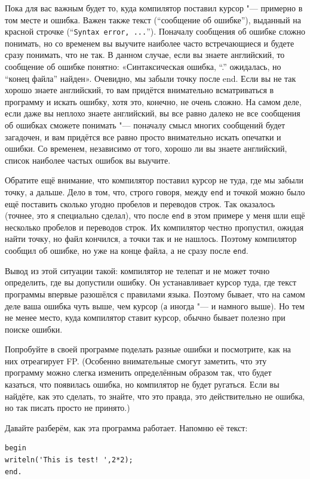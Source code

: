 Пока для вас важным будет то, куда компилятор поставил курсор "--- примерно в том месте и ошибка. Важен также
текст (``сообщение об ошибке''), выданный на красной строчке (``\verb`Syntax error, ...`''). Поначалу сообщения об ошибке
сложно понимать, но со временем вы выучите наиболее часто встречающиеся и будете сразу понимать, что не так.
В данном случае, если вы знаете английский, то сообщение об ошибке понятно: «Синтаксическая ошибка, ``.'' ожидалась, но ``конец файла'' найден». Очевидно, мы забыли точку после end. Если вы не так хорошо знаете английский,
то вам придётся внимательно всматриваться в программу и искать ошибку, хотя это, конечно, не очень сложно. На
самом деле, если даже вы неплохо знаете английский, вы все равно далеко не все сообщения об ошибках сможете понимать "---
поначалу смысл многих сообщений будет загадочен, и вам придётся все равно просто внимательно искать опечатки
и ошибки. Со временем, независимо от того, хорошо ли вы знаете английский, список наиболее частых ошибок вы
выучите.

Обратите ещё внимание, что компилятор поставил курсор не туда, где мы забыли точку, а дальше. Дело в том, что, строго говоря, между \verb`end` и точкой можно было ещё поставить сколько угодно пробелов и переводов строк. Так оказалось (точнее, это я специально сделал), что после \verb`end` в этом примере у меня шли ещё несколько пробелов и переводов строк. Их компилятор честно пропустил, ожидая найти точку, но файл кончился, а точки так и не нашлось. Поэтому компилятор сообщил об ошибке, но уже на конце файла, а не сразу после \verb`end`. 

Вывод из этой ситуации такой: компилятор не телепат и не может точно определить, где вы допустили ошибку. Он устанавливает курсор туда, где текст программы впервые разошёлся с правилами языка. Поэтому бывает, что на самом деле ваша ошибка чуть выше, чем курсор (а иногда "--- и намного выше). Но тем не менее место, куда компилятор ставит курсор, обычно бывает полезно при поиске ошибки.

Попробуйте в своей программе поделать разные ошибки и посмотрите, как на них отреагирует FP. 
(Особенно внимательные смогут заметить, что эту программу можно слегка изменить определённым образом так, 
что будет казаться, что появилась ошибка, но компилятор не будет ругаться. Если вы найдёте, как это 
сделать, то знайте, что это правда, это действительно не ошибка, но так писать просто не принято.)


Давайте разберём, как эта программа работает. Напомню её текст:
\begin{verbatim}
begin
writeln('This is test! ',2*2);
end.
\end{verbatim}


